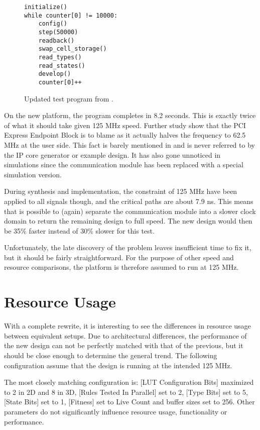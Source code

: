 \begin{figure}[!ht]
\begin{lstlisting}[xleftmargin=0.34\textwidth]
initialize()
while counter[0] != 10000:
    config()
    step(50000)
    readback()
    swap_cell_storage()
    read_types()
    read_states()
    develop()
    counter[0]++
\end{lstlisting}
\caption[Test program] {
    Updated test program from \cite{djupdal2003sblock}.
}
\label{fig:test-program}
\end{figure}

On the new platform, the program completes in 8.2 seconds.
This is exactly twice of what it should take given 125 MHz speed.
Further study show that the PCI Express Endpoint Block is to blame as it actually halves the frequency to 62.5 MHz at the user side.
This fact is barely mentioned in \cite{ug672} and is never referred to by the IP core generator or example design.
It has also gone unnoticed in simulations since the communication module has been replaced with a special simulation version.

During synthesis and implementation, the constraint of 125 MHz have been applied to all signals though, and the critical paths are about 7.9 ns.
This means that is possible to (again) separate the communication module into a slower clock domain to return the remaining design to full speed.
The new design would then be 35\% faster instead of 30\% slower for this test.

Unfortunately, the late discovery of the problem leaves insufficient time to fix it, but it should be fairly straightforward.
For the purpose of other speed and resource comparisons, the platform is therefore assumed to run at 125 MHz.


\section{Resource Usage}

With a complete rewrite, it is interesting to see the differences in resource usage between equivalent setups.
Due to architectural differences, the performance of the new design can not be perfectly matched with that of the previous, but it should be close enough to determine the general trend.
The following configuration assume that the design is running at the intended 125 MHz.

The most closely matching configuration is:
[LUT Configuration Bits] maximized to 2 in 2D and 8 in 3D,
[Rules Tested In Parallel] set to 2,
[Type Bits] set to 5,
[State Bits] set to 1,
[Fitness] set to Live Count
and buffer sizes set to 256.
Other parameters do not significantly influence resource usage, functionality or performance.


